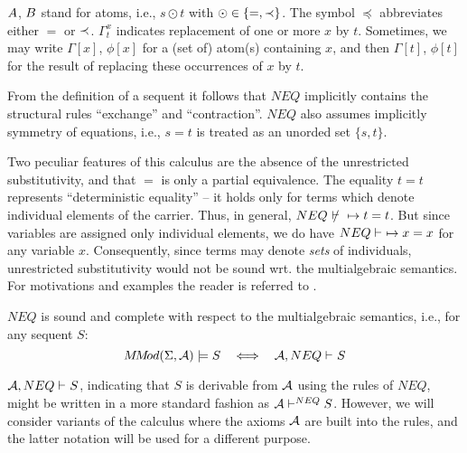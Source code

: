 \noindent
$A$, $B$ stand for atoms, i.e., $s\odot t$ with $\odot\in\{=,\mathbin{\prec}\}$.
 The symbol $\preceq$ abbreviates either $=$ or $\mathbin{\prec}$. 
$\Gamma_t^x$ indicates replacement of one or more $x$ by $t$.
Sometimes, we may write $\Gamma[x]$, $\phi[x]$ for a (set of) atom(s) containing
$x$, and then $\Gamma[t]$, $\phi[t]$ for the result of replacing these occurrences
of $x$ by $t$.

%
\begin{REMARK} \label{re:1}
{From the definition of a sequent it follows that $NEQ$ implicitly contains the 
structural rules ``exchange'' and ``contraction''.}
$NEQ$ also assumes implicitly symmetry of equations, i.e., $s=t$ is treated as an 
unorded set $\{s,t\}$. 

Two peculiar features of this calculus are the absence of the unrestricted 
substitutivity,
and that $=$ is only a partial equivalence.
  The equality $t=t$ represents ``deterministic equality'' -- it holds only for terms which
denote individual elements of the carrier.
 Thus, in general, $NEQ\ \not\vdash\ \Seq t=t$. 
But since
variables are assigned only individual elements, we do have 
$NEQ\vdash\ \mathrel{\mapsto} x=x$  for any variable $x$. Consequently, since
terms may denote {\em sets} of individuals, unrestricted substitutivity would not
be sound wrt. the multialgebraic semantics. For motivations and examples the reader
is referred to \cite{WM,Top,Broy}.
\end{REMARK}
%
\begin{THEOREM}\label{th:cmpl} {\em \cite{WM}}
$NEQ$ is sound and complete with respect to the multialgebraic semantics, i.e.,
for any sequent $S$:
\[\MMod(\Sigma,\Ax)\models S \ \ \iff \ \ \der{\Ax, NEQ}{}S\]
\end{THEOREM}
\noindent
 ${{\cal {A}},NEQ}\vdash^{{}}S$,  indicating that $S$ is derivable from ${\cal {A}}$
using the rules of $NEQ$, might be written in a more standard fashion as
 ${\cal {A}}{}\vdash^{{NEQ}}S$. However, we will consider variants of the calculus
 where the axioms ${\cal {A}}$ are built into the rules, and the latter notation will be used
 for a different purpose.


